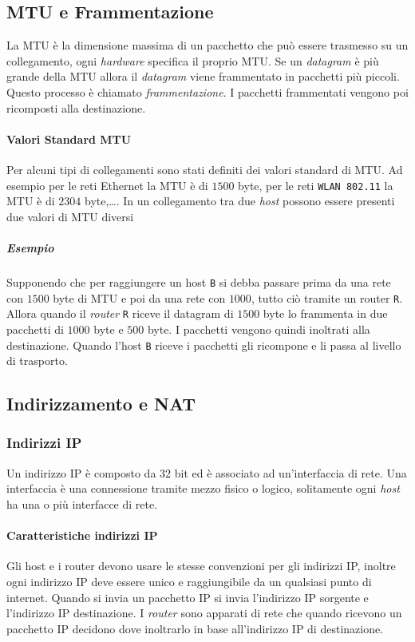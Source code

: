     \subsection[\texttt{MTU} e Frammentazione]{\Acrshort*{MTU} e Frammentazione}
        La \acrfull*{MTU} è la dimensione massima di un pacchetto che può essere trasmesso su un collegamento, ogni \textit{hardware} specifica il proprio \Acrshort*{MTU}. Se un \textit{datagram} è più grande della \Acrshort*{MTU} allora il \textit{datagram} viene frammentato in pacchetti più piccoli. Questo processo è chiamato \textit{frammentazione}. I pacchetti frammentati vengono poi ricomposti alla destinazione.
        \paragraph{Valori Standard \Acrshort*{MTU}} Per alcuni tipi di collegamenti sono stati definiti dei valori standard di \Acrshort*{MTU}. Ad esempio per le reti Ethernet la \Acrshort*{MTU} è di $1500$ byte, per le reti \texttt{\Acrshort*{WLAN} 802.11} la \Acrshort*{MTU} è di $2304$ byte,\dots. In un collegamento tra due \textit{host} possono essere presenti due valori di \Acrshort*{MTU} diversi
        \subparagraph{Esempio} Supponendo che per raggiungere un host \texttt{B} si debba passare prima da una rete con $1500$ byte di \Acrshort*{MTU} e poi da una rete con $1000$, tutto ciò tramite un router \texttt{R}. Allora quando il \textit{router} \texttt{R} riceve il datagram di $1500$ byte lo frammenta in due pacchetti di $1000$ byte e $500$ byte. I pacchetti vengono quindi inoltrati alla destinazione. Quando l'host \texttt{B} riceve i pacchetti gli ricompone e li passa al livello di trasporto.
        
    \subsection[Indirizzamento e \texttt{NAT}]{Indirizzamento e \Acrshort*{NAT}}
        \subsubsection{Indirizzi \Acrshort*{IP}}
            Un indirizzo \Acrshort*{IP} è composto da $32$ bit ed è associato ad un'interfaccia di rete. Una interfaccia è una connessione tramite mezzo fisico o logico, solitamente ogni \textit{host} ha una o più interfacce di rete.
            \paragraph{Caratteristiche indirizzi \Acrshort*{IP}} Gli host e i router devono usare le stesse convenzioni per gli indirizzi \Acrshort*{IP}, inoltre ogni indirizzo \Acrshort*{IP} deve essere unico e raggiungibile da un qualsiasi punto di internet. Quando si invia un pacchetto \Acrshort*{IP} si invia l'indirizzo \Acrshort*{IP} sorgente e l'indirizzo \Acrshort*{IP} destinazione. I \textit{router} sono apparati di rete che quando ricevono un pacchetto \Acrshort*{IP} decidono dove inoltrarlo in base all'indirizzo \Acrshort*{IP} di destinazione.
